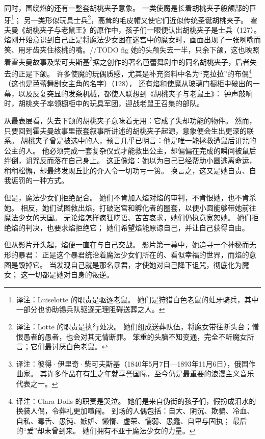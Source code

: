 同时，围绕焰的还有一整套胡桃夹子意象。
一类使魔是长着胡桃夹子般颌部的巨牙\footnote{%
    译注：Luiselotte 的职责是驱逐老鼠。
    她们是狩猎白色老鼠的蛀牙骑兵，其中一部分也协助锡兵队驱逐无理阻碍送葬之人。
}；
另一类形似玩具士兵\footnote{%
    译注：Lotte 的职责是执行处决。
    她们组成送葬队伍，将魔女带往断头台；憎恨愚者的愚者，也会对其无情断罪。
    笨重的头脑不知变通，完全不听魔女所言；它们最讨厌白色老鼠。
}，高耸的毛皮帽又使它们近似传统圣诞胡桃夹子。
霍夫曼《胡桃夹子与老鼠王》的原作中，孩子们一眼便认出胡桃夹子是士兵（127）。
焰刚开始意识到自己正是将魔法少女困在迷宫中的魔女时，画面出现了一张咧嘴而笑、用牙齿夹住核桃的嘴。//TODO fig
她的头颅失去一半，只余下颌，这也映照着霍夫曼故事及柴可夫斯基\footnote{%
    译注：彼得·伊里奇·柴可夫斯基（1840年5月7日—1893年11月6日），俄国作曲家。
    其许多作品在有生之年就享誉国际，至今仍是最重要的浪漫主义音乐代表之一。
}据之创作的著名芭蕾舞剧中的同名胡桃夹子，后者失去的正是下颌。
许多使魔的玩偶质感，尤其是补充资料中名为“克拉拉”的布偶\footnote{%
    译注：Clara Dolls 的职责是哭泣。
    她们是来自伪街的孩子们，假扮成泪水的换装人偶，令葬礼更加喧闹。
    到场的人偶包括：自大、阴沉、欺骗、冷血、自私、毒舌、愚钝、嫉妒、懒惰、虚荣、懦弱、愚蠢、自卑与固执；
    最后的“爱”却未曾到来。
    她们拥有不亚于魔法少女的力量。
}（这也是芭蕾舞剧女主角的名字）（128），
还有焰和使魔从玻璃门橱柜中破出的一幕，以及反复突显的发条机械，都使人联想到《胡桃夹子与老鼠王》：
钟声敲响时，胡桃夹子率领橱柜中的玩具军团，迎战老鼠王召集的部队。

从最表层看，失去下颌的胡桃夹子意味着无用：它成了失却功能的物件。
然而，只要回到霍夫曼故事里嵌套叙事所讲述的胡桃夹子起源，意象便会生出更深的联系。
胡桃夹子曾是被选中的人，预言几乎已明言：他是唯一能拯救遭鼠后诅咒的公主的人。
他必须完成一套复杂仪式才能救出公主，却偏偏在完成的瞬间被鼠后绊倒，诅咒反而落在自己身上。
这正像焰：她以为自己已经帮助小圆逃离命运，稍稍松懈，却最终发现丘比的介入令一切功亏一篑。
换言之，这又是她自责、自我惩罚的一种方式。

但是，魔法少女们拒绝配合。
她们不肯加入焰对焰的审判，不肯恨她，也不肯杀她。
相反，她们试图救出焰，打破迷宫和孵化者的圈套，以便小圆能够带她前往魔法少女的天国。
无论焰怎样疯狂呓语、苦苦哀求，她们仍执意宽恕她。
她们拒绝焰的判决，也要求焰拒绝它；
她们希望焰能原谅自己，并让自己获得自由。

但从影片开头起，焰便一直在与自己交战。
影片第一幕中，她追寻一个神秘而无形的暴君：
正是这个暴君统治着魔法少女们所在的、看似幸福的世界，而焰的意图是毁掉它。
当发现自己就是那名暴君，才使她对自己降下诅咒，彻底化为魔女；
这一切都是她对自身的叛逆。

